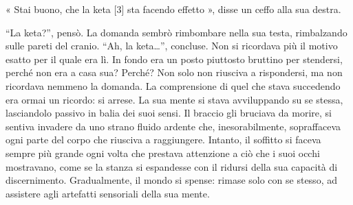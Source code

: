 « Stai buono, che la keta [3] sta facendo effetto », disse un ceffo alla sua destra.

``La keta?'', pensò. La domanda sembrò rimbombare nella sua testa, rimbalzando sulle pareti del cranio. ``Ah, la keta\ldots'', concluse. Non si ricordava più il motivo esatto per il quale era lì. In fondo era un posto piuttosto bruttino per stendersi, perché non era a casa sua? Perché? Non solo non riusciva a rispondersi, ma non ricordava nemmeno la domanda. La comprensione di quel che stava succedendo era ormai un ricordo: si arrese. La sua mente si stava avviluppando su se stessa, lasciandolo passivo in balia dei suoi sensi. Il braccio gli bruciava da morire, si sentiva invadere da uno strano fluido ardente che, inesorabilmente, sopraffaceva ogni parte del corpo che riusciva a raggiungere. Intanto, il soffitto si faceva sempre più grande ogni volta che prestava attenzione a ciò che i suoi occhi mostravano, come se la stanza si espandesse con il ridursi della sua capacità di discernimento. Gradualmente, il mondo si spense: rimase solo con se stesso, ad assistere agli artefatti sensoriali della sua mente.
